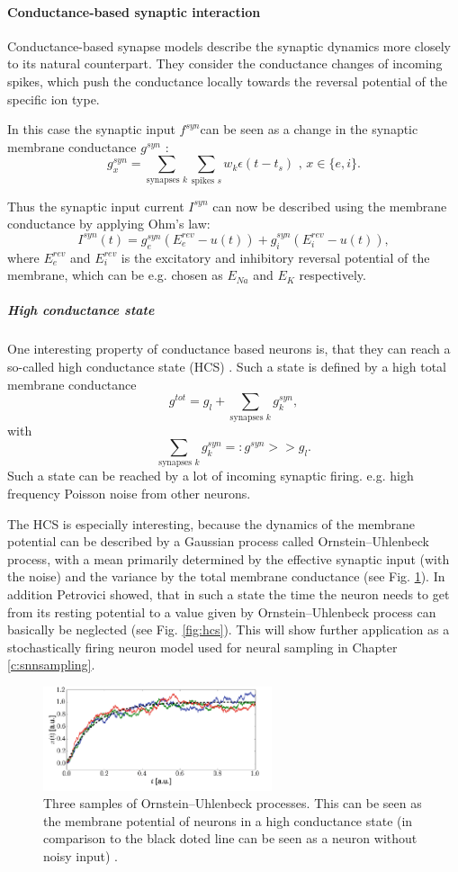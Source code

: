 \paragraph{Conductance-based synaptic interaction} \label{c:coba}
Conductance-based synapse models describe the synaptic dynamics more closely to its natural counterpart. They consider the conductance changes of incoming spikes, which push the conductance locally towards the reversal potential of the specific ion type. 

In this case the synaptic input $f^{syn} $can be seen as a change in the synaptic membrane conductance $g^{syn}$ :
\[
g_x^{syn} = \sum_{\text{synapses } k } \sum_{\text{spikes } s} w_k \epsilon(t - t_s) \text{ ,      } x \in \{e, i\}.
\]

Thus the synaptic input current $I^{syn}$ can now be described using the membrane conductance by applying Ohm's law:
\[
I^{syn}(t) = g_e^{syn} (E_e^{rev} - u(t)) + g_i^{syn} (E_i^{rev} - u(t)),
\]
where $E_e^{rev}$ and $E_i^{rev}$ is the excitatory and inhibitory reversal potential of the membrane, which can be e.g. chosen as $E_{Na}$ and $E_{K}$ respectively.  

\subparagraph{High conductance state} \label{c:hcs}
One interesting property of conductance based neurons is, that they can reach a so-called high conductance state (HCS) \cite{Petrovici2016}. Such a state is defined by a high total membrane conductance 
\[
g^{tot} = g_l + \sum_{\text{synapses } k} g_k^{syn},
\]
with 
\[
\sum_{\text{synapses } k} g_k^{syn} =: g^{syn} >> g_l .
\]
Such a state can be reached by a lot of incoming synaptic firing. e.g. high frequency Poisson noise from other neurons. 

The HCS is especially interesting, because the dynamics of the membrane potential can be described by a Gaussian process called Ornstein–Uhlenbeck process, with a mean primarily determined by the effective synaptic input (with the noise) and the variance by the total membrane conductance (see Fig. \ref{fig:ornuhl}).
In addition Petrovici showed, that in such a state the time the neuron needs to get from its resting potential to a value given by Ornstein–Uhlenbeck process can basically be neglected (see Fig. \ref{fig:hcs}).
This will show further application as a stochastically firing neuron model used for neural sampling  in Chapter \ref{c:snnsampling}.

\begin{figure}
	\centering
    	\includegraphics[width=0.6\textwidth]{imgs/orn_uhl_process.png} 
    \caption{Three samples of Ornstein–Uhlenbeck processes. This can be seen as the membrane potential of neurons in a high conductance state (in comparison to the black doted line can be seen as a neuron without noisy input) \cite{Petrovici2016}.}
	\label{fig:ornuhl}
\end{figure}


